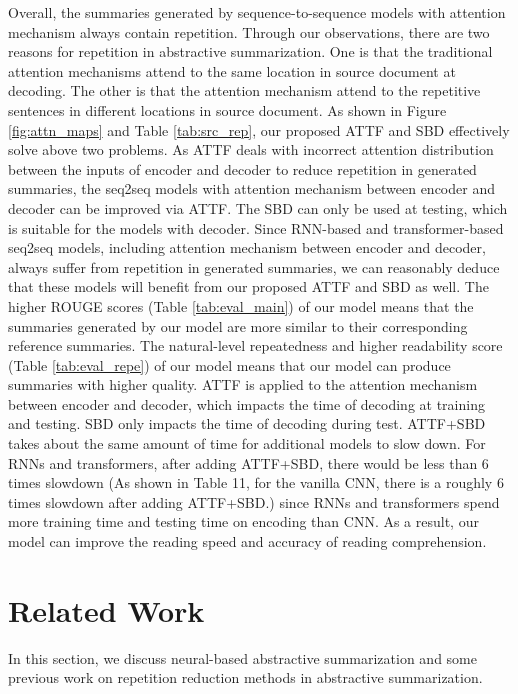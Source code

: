 \documentclass{nle}
\theoremstyle{definition}
\newcommand{\figref}[1]{Figure \ref{#1}}
\newcommand{\tabref}[1]{Table \ref{#1}}
\begin{document}
Overall, the summaries generated by sequence-to-sequence models with attention mechanism always contain repetition.  
Through our observations, there are two reasons for repetition in abstractive summarization.
One is that the traditional attention mechanisms attend to the same location in source document at decoding.
The other is that the attention mechanism attend to the repetitive sentences in different locations in source document. 
As shown in \figref{fig:attn_maps} and \tabref{tab:src_rep},
our proposed ATTF and SBD effectively solve above two problems.  
As ATTF deals with incorrect attention distribution
between the inputs of encoder and decoder to 
reduce repetition in generated summaries,
the seq2seq models with attention mechanism between encoder and decoder
can be improved via ATTF.
The SBD can only be used at testing, which is suitable for the models with decoder.
Since RNN-based and transformer-based seq2seq models,
including attention mechanism between encoder and decoder,
always suffer from repetition in generated summaries, 
we can reasonably deduce that these models will benefit from our proposed ATTF and SBD as well.
The higher ROUGE scores (\tabref{tab:eval_main}) of our model means that
the summaries generated by our model are more similar to their corresponding reference summaries.
The natural-level repeatedness and higher readability score (\tabref{tab:eval_repe}) of our model means 
that our model can produce summaries with higher quality.
ATTF is applied to the attention mechanism between encoder and decoder,
which impacts the time of decoding at training and testing.
SBD only impacts the time of decoding during test.
ATTF+SBD takes about the same amount of time for additional models to slow down.
For RNNs and transformers, after adding ATTF+SBD,
there would be less than 6 times slowdown
(As shown in Table 11, for the vanilla CNN, there is a roughly 6 times slowdown after adding ATTF+SBD.)
since RNNs and transformers spend more training time and testing time on encoding than CNN.
As a result, our model can improve the reading speed and accuracy of reading comprehension.

\section{Related Work}
\label{sec:related}
In this section, we 
discuss neural-based abstractive summarization
and some previous work on repetition reduction methods in
abstractive summarization.
\end{document}

